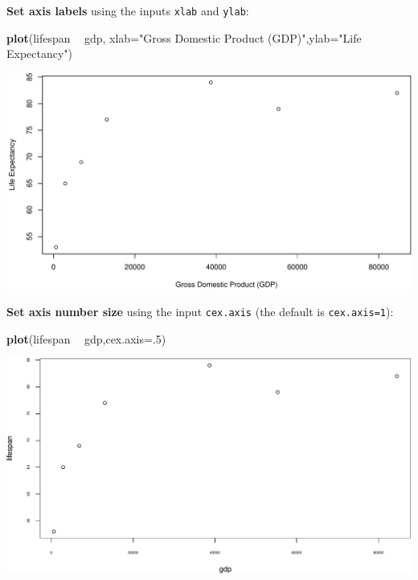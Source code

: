 \documentclass[
]{book}
\newenvironment{Shaded}{\begin{snugshade}}{\end{snugshade}}
\newcommand{\DataTypeTok}[1]{\textcolor[rgb]{0.13,0.29,0.53}{#1}}
\newcommand{\DecValTok}[1]{\textcolor[rgb]{0.00,0.00,0.81}{#1}}
\newcommand{\KeywordTok}[1]{\textcolor[rgb]{0.13,0.29,0.53}{\textbf{#1}}}
\newcommand{\NormalTok}[1]{#1}
\newcommand{\OperatorTok}[1]{\textcolor[rgb]{0.81,0.36,0.00}{\textbf{#1}}}
\newcommand{\StringTok}[1]{\textcolor[rgb]{0.31,0.60,0.02}{#1}}
\begin{document}
\textbf{Set axis labels} using the inputs \texttt{xlab} and \texttt{ylab}:

\begin{Shaded}
\begin{Highlighting}[]
\KeywordTok{plot}\NormalTok{(lifespan }\OperatorTok{~}\StringTok{ }\NormalTok{gdp, }\DataTypeTok{xlab=}\StringTok{"Gross Domestic Product (GDP)"}\NormalTok{,}\DataTypeTok{ylab=}\StringTok{"Life Expectancy"}\NormalTok{)}
\end{Highlighting}
\end{Shaded}

\includegraphics{figures/unnamed-chunk-107-1.pdf}

\textbf{Set axis number size} using the input \texttt{cex.axis} (the default is \texttt{cex.axis=1}):

\begin{Shaded}
\begin{Highlighting}[]
\KeywordTok{plot}\NormalTok{(lifespan }\OperatorTok{~}\StringTok{ }\NormalTok{gdp,}\DataTypeTok{cex.axis=}\NormalTok{.}\DecValTok{5}\NormalTok{)}
\end{Highlighting}
\end{Shaded}

\includegraphics{figures/unnamed-chunk-108-1.pdf}
\end{document}
